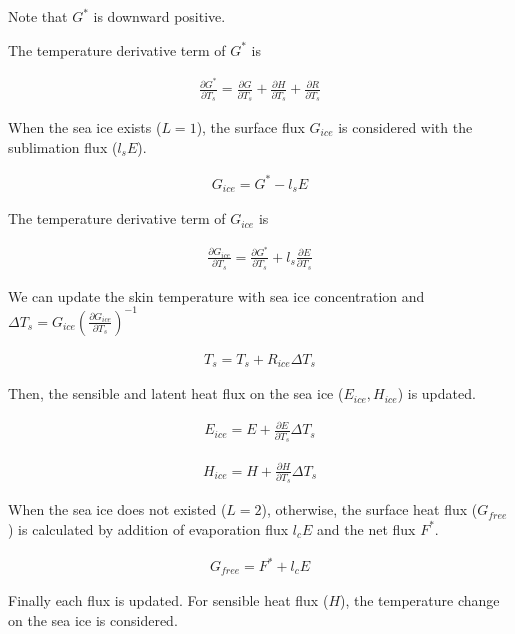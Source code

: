 Note that \(G^*\) is downward positive.

The temperature derivative term of \(G^*\) is

\begin{eqnarray}
    \frac{\partial G^*}{\partial T_s} = \frac{\partial G}{\partial T_s}+\frac{\partial H}{\partial T_s}+\frac{\partial R}{\partial T_s}
\end{eqnarray}

When the sea ice exists (\(L=1\)), the surface flux \(G_{ice}\) is
considered with the sublimation flux (\(l_s E\)).

\begin{eqnarray}
    G_{ice} = G^* - l_s E
\end{eqnarray}

The temperature derivative term of \(G_{ice}\) is

\begin{eqnarray}
    \frac{\partial G_{ice}}{\partial T_s}=\frac{\partial G^*}{\partial T_s} + l_s\frac{\partial E}{\partial T_s}
\end{eqnarray}

We can update the skin temperature with sea ice concentration and
\(\Delta T_s=G_{ice} ( \frac{\partial G_{ice}}{\partial T_s})^{-1}\)

\begin{eqnarray}
    T_s = T_s +R_{ice} \Delta T_s
\end{eqnarray}

Then, the sensible and latent heat flux on the sea ice
(\(E_{ice},H_{ice}\)) is updated.

\begin{eqnarray}
    E_{ice} = E + \frac{\partial E}{\partial T_s}\Delta T_s
\end{eqnarray}

\begin{eqnarray}
    H_{ice} = H + \frac{\partial H}{\partial T_s}\Delta T_s
\end{eqnarray}

When the sea ice does not existed (\(L=2\)), otherwise, the surface heat
flux (\(G_{free}\)) is calculated by addition of evaporation flux
\(l_cE\) and the net flux \(F^\ast\).

\begin{eqnarray}
    G_{free}=F^\ast + l_cE
\end{eqnarray}

Finally each flux is updated. For sensible heat flux (\(H\)), the
temperature change on the sea ice is considered.

